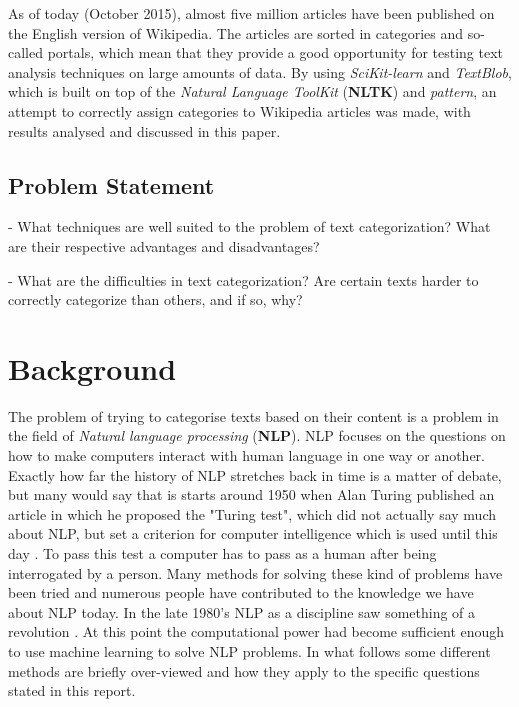 \documentclass[a4paper,10pt]{article}
\begin{document}
\noindent As of today (October 2015), almost five million articles have been published on the English version of Wikipedia\cite{wikipedia}. The articles are sorted in categories and so-called portals, which mean that they provide a good opportunity for testing text analysis techniques on large amounts of data. By using \textit{SciKit-learn} and \textit{TextBlob}, which is built on top of the \textit{Natural Language ToolKit} (\textbf{NLTK}) and \textit{pattern}\cite{textblob}, an attempt to correctly assign categories to Wikipedia articles was made, with results analysed and discussed in this paper. 

\vspace{3mm}

\subsection{Problem Statement}

\vspace{3mm}


- What techniques are well suited to the problem of text categorization? What are their respective advantages and disadvantages?

\vspace{3mm}

- What are the difficulties in text categorization? Are certain texts harder to correctly categorize than others, and if so, why?


\vspace{3mm}


\section{Background}

\vspace{3mm}

The problem of trying to categorise texts based on their content is a problem in the field of \textit{Natural language processing} (\textbf{NLP}). NLP focuses on the questions on how to make computers interact with human language in one way or another.\\

\noindent Exactly how far the history of NLP stretches back in time is a matter of debate, but many would say that is starts around 1950 when Alan Turing published an article in which he proposed the "Turing test", which did not actually say much about NLP, but set a criterion for computer intelligence which is used until this day \cite{AI}. To pass this test a computer has to pass as a human after being interrogated by a person. Many methods for solving these kind of problems have been tried and numerous people have contributed to the knowledge we have about NLP today. In the late 1980's NLP as a discipline saw something of a revolution \cite{historyNLP}. At this point the computational power had become sufficient enough to use machine learning to solve NLP problems. In what follows some different methods are briefly over-viewed and how they apply to the specific questions stated in this report.\\
\end{document}
